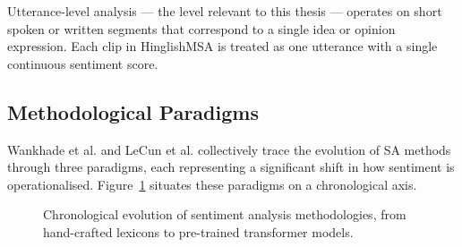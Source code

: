 Utterance-level analysis --- the level relevant to this thesis --- operates on short spoken or written segments that correspond to a single idea or opinion expression. Each clip in HinglishMSA is treated as one utterance with a single continuous sentiment score.

\subsection{Methodological Paradigms}

Wankhade et al. \cite{wankhade2022survey} and LeCun et al. \cite{lecun2015deep} collectively trace the evolution of SA methods through three paradigms, each representing a significant shift in how sentiment is operationalised. Figure~\ref{fig:sa_evolution} situates these paradigms on a chronological axis.

\begin{figure}[ht]
\centering
{}
\caption{Chronological evolution of sentiment analysis methodologies, from hand-crafted lexicons to pre-trained transformer models.}
\label{fig:sa_evolution}
\end{figure}

